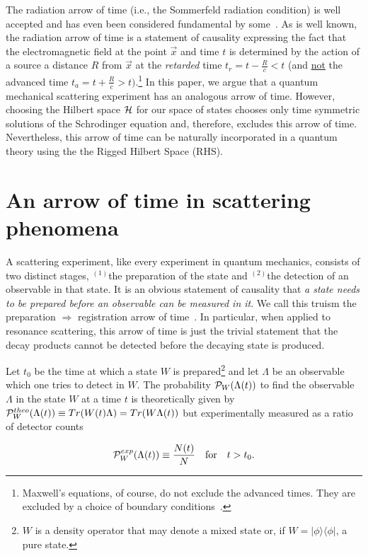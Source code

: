 \documentclass[12pt]{article}
\begin{document}
The radiation arrow of time (i.e., the Sommerfeld radiation condition) is well accepted and has even been considered fundamental by some~\cite{Ritz.Ernst}.  As is well known, the radiation arrow of time is a statement of causality expressing the fact that the electromagnetic field at the point ${\vec x}$ and time $t$ is determined by the action of a source a distance $R$ from ${\vec x}$ at the {\it retarded} time $t_r = t - \frac{R}{c} < t$ (and \underline{not} the advanced time $t_a = t + \frac{R}{c} > t)$.\footnote{Maxwell's equations, of course, do not exclude the advanced times.  They are excluded by a choice of boundary conditions~\cite{Ritz.Ernst}.}  In this paper, we argue that a quantum mechanical scattering experiment has an analogous arrow of time.  However, choosing the Hilbert space ${\cal H}$ for our space of states chooses only time symmetric solutions of the Schrodinger equation and, therefore, excludes this arrow of time.  Nevertheless, this arrow of time can be naturally incorporated in a quantum theory using the the Rigged Hilbert Space (RHS).

\section{An arrow of time in scattering phenomena}
\label{sec-arrow.of.time}

A scattering experiment, like every experiment in quantum mechanics, consists of two distinct stages, $^{(1)}$the preparation of the state and $^{(2)}$the detection of an observable in that state.  It is an obvious statement of causality that {\it a state needs to be prepared before an observable can be measured in it}.  We call this truism the preparation $\Rightarrow$ registration arrow of time~\cite{Ludwig}.  In particular, when applied to resonance scattering, this arrow of time is just the trivial statement that the decay products cannot be detected before the decaying state is produced.

Let $t_0$ be the time at which a state $W$ is prepared\footnote{$W$ is a density operator that may denote a mixed state or, if $W = |\phi\rangle\langle\phi|$, a pure state.} and let $\Lambda$ be an observable which one tries to detect in $W$.  The probability ${\cal P}_W(\Lambda(t))$ to find the observable $\Lambda$ in the state $W$ at a time $t$ is theoretically given by ${\cal P}_W^{theo}(\Lambda(t)) \equiv Tr(W(t)\Lambda) = Tr(W\Lambda(t))$ but experimentally measured as a ratio of detector counts

\begin{equation}
{\cal P}_W^{exp}(\Lambda(t)) \equiv \frac{N(t)}{N} \,\,\,\,\,\, \mbox{for} \,\,\,\,\,\, t > t_0.
\end{equation}
\end{document}
